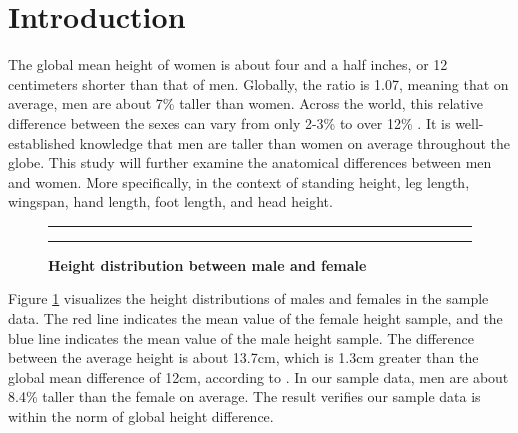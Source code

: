 \documentclass[]{article}
\begin{document}
\vskip -8.5pt




\noindent  

\section{Introduction}
\label{sec:intro}

\noindent The global mean height of women is about four and a half
inches, or 12 centimeters shorter than that of men. Globally, the ratio
is 1.07, meaning that on average, men are about 7\% taller than women.
Across the world, this relative difference between the sexes can vary
from only 2-3\% to over 12\% \citep{owidhumanheight:2013}. It is
well-established knowledge that men are taller than women on average
throughout the globe. This study will further examine the anatomical
differences between men and women. More specifically, in the context of
standing height, leg length, wingspan, hand length, foot length, and
head height.

\begin{figure}[!ht]
    \hrule
    \caption{ \textbf{Height distribution between male and female} }
    \begin{center}
    \end{center}
    \label{fig:height-dist}
    \hrule
\end{figure}

\noindent Figure \ref{fig:height-dist} visualizes the height
distributions of males and females in the sample data. The red line
indicates the mean value of the female height sample, and the blue line
indicates the mean value of the male height sample. The difference
between the average height is about 13.7cm, which is 1.3cm greater than
the global mean difference of 12cm, according to
\citep{owidhumanheight:2013}. In our sample data, men are about 8.4\%
taller than the female on average. The result verifies our sample data
is within the norm of global height difference.
\end{document}
